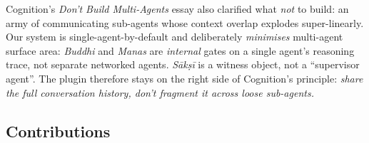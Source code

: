 Cognition's \emph{Don't Build Multi-Agents} essay \citep{yan2025dontbuild} also clarified what \emph{not} to build: an army of communicating sub-agents whose context overlap explodes super-linearly. Our system is single-agent-by-default and deliberately \emph{minimises} multi-agent surface area: \emph{Buddhi} and \emph{Manas} are \emph{internal} gates on a single agent's reasoning trace, not separate networked agents. \emph{Sākṣī} is a witness object, not a ``supervisor agent''. The plugin therefore stays on the right side of Cognition's principle: \emph{share the full conversation history, don't fragment it across loose sub-agents.}

\subsection{Contributions}\label{contributions}

